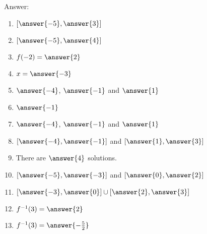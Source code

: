 \documentclass{ximera}
\begin{document}
\begin{exercise}
Answer:

\begin{enumerate}
\item  $[\answer{-5},\answer{3}]$
\item  $[\answer{-5},\answer{4}]$
\item  $f(-2)=\answer{2}$
\item  $x=\answer{-3}$
\item  $\answer{-4}$, $\answer{-1}$ and $\answer{1}$
\item  $\answer{-1}$
\item  $\answer{-4}$, $\answer{-1}$ and $\answer{1}$
\item  $[\answer{-4},\answer{-1}]$ and $[\answer{1},\answer{3}]$
\item  There are $\answer{4}$ solutions.
\item  $[\answer{-5},\answer{-3}]$ and $[\answer{0},\answer{2}]$
\item  $[\answer{-3},\answer{0}]\cup[\answer{2},\answer{3}]$
\item  $f^{-1}(3)=\answer{2}$
\item  $f^{-1}(3)=\answer{-\frac{5}{2}}$
\end{enumerate}


\end{exercise}
\end{document}
